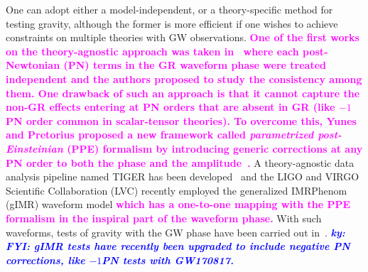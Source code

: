 \documentclass[prd,twocolumn,nofootinbib]{revtex4-1}
\newcommand{\ky}[1]{\textcolor{blue}{\it{\textbf{ky: #1}}} }
\newcommand{\kent}[1]{\textcolor{magenta}{\textbf{#1}} }
\begin{document}




One can adopt either a model-independent, or a theory-specific method for testing gravity, although the former is more efficient if one wishes to achieve constraints on multiple theories with GW observations. \kent{One of the first works on the theory-agnostic approach was taken in~\cite{Arun:2006yw,Arun:2006hn,Mishra:2010tp} where each post-Newtonian (PN) terms in the GR waveform phase were treated independent and the authors proposed to study the consistency among them. One drawback of such an approach is that it cannot capture the non-GR effects entering at PN orders that are absent in GR (like $-1$PN order common in scalar-tensor theories). To overcome this, Yunes and Pretorius proposed a new framework called \emph{parametrized post-Einsteinian} (PPE) formalism by introducing generic corrections at any PN order to both the phase and the amplitude~\cite{Yunes:2009ke,Chatziioannou:2012rf}.}
A theory-agnostic data analysis pipeline named TIGER has been developed~\cite{Agathos:2013upa,Meidam:2014jpa} and the LIGO and VIRGO Scientific Collaboration (LVC) recently employed the generalized IMRPhenom (gIMR) waveform model \kent{which has a one-to-one mapping with the PPE formalism in the inspiral part of the waveform phase.} With such waveforms, tests of gravity with the GW phase have been carried out in~\cite{Monitor:2017mdv,TheLIGOScientific:2016pea,Yunes:2016jcc,Abbott:2017vtc,LIGOScientific:2019fpa,TheLIGOScientific:2016src}. 
\ky{FYI: gIMR tests have recently been upgraded to include negative PN corrections, like $-1$PN tests with GW170817.}
\end{document}
